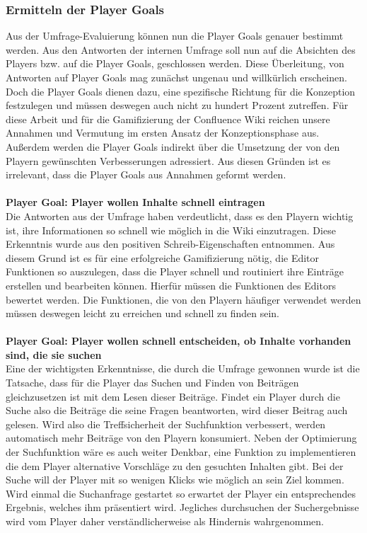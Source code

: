 \documentclass[a4paper,12pt]{scrartcl}
\begin{document}
\subsubsection{Ermitteln der Player Goals}
Aus der Umfrage-Evaluierung können nun die Player Goals genauer bestimmt werden. Aus den Antworten der internen Umfrage soll nun auf die Absichten des Players bzw. auf die Player Goals, geschlossen werden. Diese Überleitung,
von Antworten auf Player Goals mag zunächst ungenau und willkürlich erscheinen. Doch die Player Goals dienen dazu, eine spezifische Richtung für die Konzeption festzulegen und müssen deswegen auch nicht zu hundert Prozent zutreffen. Für diese Arbeit und für die Gamifizierung der Confluence Wiki reichen unsere Annahmen und Vermutung im ersten Ansatz der Konzeptionsphase aus. Außerdem werden die Player Goals indirekt über die Umsetzung der von den Playern gewünschten Verbesserungen adressiert. Aus diesen Gründen ist es irrelevant, dass die Player Goals aus Annahmen geformt werden.
\\\\
\textbf{Player Goal: Player wollen Inhalte schnell eintragen}\\
Die Antworten aus der Umfrage haben verdeutlicht, dass es den Playern wichtig ist, ihre Informationen so schnell wie möglich in die Wiki einzutragen. Diese Erkenntnis wurde aus den positiven Schreib-Eigenschaften entnommen. Aus diesem Grund ist es für eine erfolgreiche Gamifizierung nötig, die Editor Funktionen so auszulegen, dass die Player schnell und routiniert ihre Einträge erstellen und bearbeiten können. Hierfür müssen die Funktionen des Editors bewertet werden. Die Funktionen, die von den Playern häufiger verwendet werden müssen deswegen leicht zu erreichen und schnell zu finden sein.
\\\\
\textbf{Player Goal: Player wollen schnell entscheiden, ob Inhalte vorhanden sind, die sie suchen}\\
Eine der wichtigsten Erkenntnisse, die durch die Umfrage gewonnen wurde ist die Tatsache, dass für die Player das Suchen und Finden von Beiträgen gleichzusetzen ist mit dem Lesen dieser Beiträge. Findet ein Player durch die Suche also die Beiträge die seine Fragen beantworten, wird dieser Beitrag auch gelesen. Wird also die Treffsicherheit der Suchfunktion verbessert, werden automatisch mehr Beiträge von den Playern konsumiert. Neben der Optimierung der Suchfunktion wäre es auch weiter Denkbar, eine Funktion zu implementieren die dem Player alternative Vorschläge zu den gesuchten Inhalten gibt. Bei der Suche will der Player mit so wenigen Klicks wie möglich an sein Ziel kommen. Wird einmal die Suchanfrage gestartet so erwartet der Player ein entsprechendes Ergebnis, welches ihm präsentiert wird. Jegliches durchsuchen der Suchergebnisse wird vom Player daher verständlicherweise als Hindernis wahrgenommen.
\end{document}
